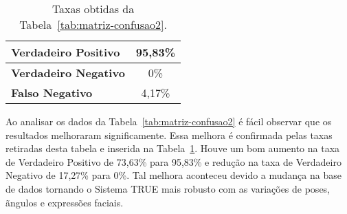 	\begin{table}[htb]
		\begin{center}
			\caption{Taxas obtidas da Tabela~\ref{tab:matriz-confusao2}.}
			\label{tab:taxas2}
			\begin{tabular}{|l|c|}
				\hline \bf Verdadeiro Positivo & 95,83\% \\
				\hline \bf Verdadeiro Negativo & 0\% \\
				\hline \bf Falso Negativo & 4,17\% \\
				\hline
			\end{tabular}
		\end{center}
	\end{table}

	Ao analisar os dados da Tabela~\ref{tab:matriz-confusao2} é fácil observar que os resultados melhoraram significamente. Essa melhora é confirmada pelas taxas retiradas desta tabela e inserida na Tabela~\ref{tab:taxas2}. Houve um bom aumento na taxa de Verdadeiro Positivo de 73,63\% para 95,83\% e redução na taxa de Verdadeiro Negativo de 17,27\% para 0\%. Tal melhora aconteceu devido a mudança na base de dados tornando o Sistema TRUE mais robusto com as variações de poses, ãngulos e expressões faciais.



